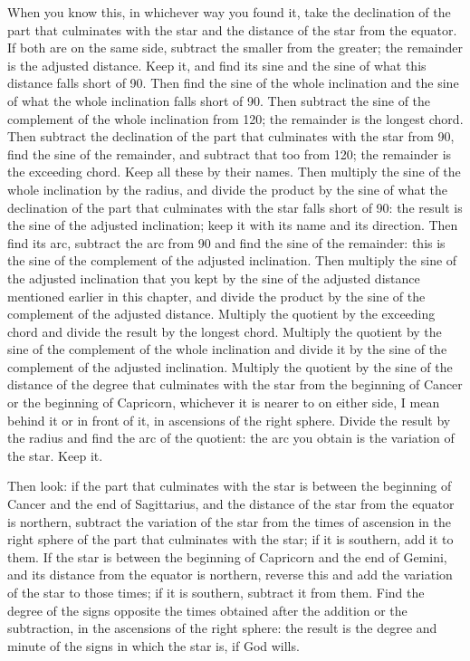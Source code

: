 \documentclass[11pt]{article}
\newcommand{\ArPage}[1]{\marginpar{\footnotesize\color{gray}Ar.\,p.\,#1}}
\begin{document}
\par \ArPage{56}When you know this, in whichever way you found it, take the declination of the part that culminates with the star and the distance of the star from the equator. If both are on the same side, subtract the smaller from the greater; the remainder is the adjusted distance. Keep it, and find its sine and the sine of what this distance falls short of 90. Then find the sine of the whole inclination and the sine of what the whole inclination falls short of 90. Then subtract the sine of the complement of the whole inclination from 120; the remainder is the longest chord. Then subtract the declination of the part that culminates with the star from 90, find the sine of the remainder, and subtract that too from 120; the remainder is the exceeding chord. Keep all these by their names. Then multiply the sine of the whole inclination by the radius, and divide the product by the sine of what the declination of the part that culminates with the star falls short of 90: the result is the sine of the adjusted inclination; keep it with its name and its direction. Then find its arc, subtract the arc from 90 and find the sine of the remainder: this is the sine of the complement of the adjusted inclination. Then multiply the sine of the adjusted inclination that you kept by the sine of the adjusted distance mentioned earlier in this chapter, and divide the product by the sine of the complement of the adjusted distance. Multiply the quotient by the exceeding chord and divide the result by the longest chord. Multiply the quotient by the sine of the complement of the whole inclination and divide it by the sine of the complement of the adjusted inclination. Multiply the quotient by the sine of the distance of the degree that culminates with the star from the beginning of Cancer or the beginning of Capricorn, whichever it is nearer to on either side, I mean behind it or in front of it, in ascensions of the right sphere. Divide the result by the radius and find the arc of the quotient: the arc you obtain is the variation of the star. Keep it.\par
\par Then look: if the part that culminates with the star is between the beginning of Cancer and the end of Sagittarius, and the distance of the star from the equator is northern, subtract the variation of the star from the times of ascension in the right sphere of the part that culminates with the star; if it is southern, add it to them. If the star is between the beginning of Capricorn and the end of Gemini, and its distance from the equator is northern, reverse this and add the variation of the star to those times; if it is southern, subtract it from them. Find the degree of the signs opposite the times obtained after the addition or the subtraction, in the ascensions of the right sphere: the result is the degree and minute of the signs in which the star is, if God wills.\par
\end{document}
